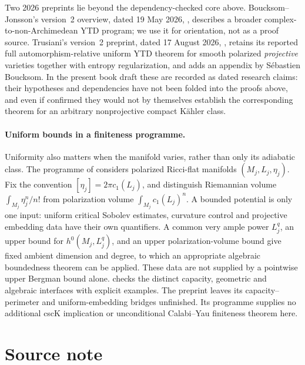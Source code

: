 Two 2026 preprints lie beyond the dependency-checked core above.
Boucksom--Jonsson's version~2 overview, dated 19 May 2026,
\cite{BJ26ComplexNA}, describes a broader complex-to-non-Archimedean YTD
program; we use it for orientation, not as a proof source.  Trusiani's
version~2 preprint, dated 17 August 2026, \cite{Trusiani26}, retains its
reported full
automorphism-relative uniform YTD theorem for smooth polarized
\emph{projective} varieties together with entropy regularization, and adds
an appendix by S\'{e}bastien Boucksom.  In the present book draft these are
recorded as dated research claims: their hypotheses and dependencies have
not been folded into the proofs above, and even if confirmed they would not
by themselves establish the corresponding theorem for an arbitrary
nonprojective compact K\"ahler class.

\paragraph{Uniform bounds in a finiteness programme.}
Uniformity also matters when the manifold varies, rather than only its
adiabatic class. The programme of
\cite[Sections~4--9]{Truong26PolarizedCYFinitenessV1} considers polarized
Ricci-flat manifolds \((M_j,L_j,\eta_j)\). Fix the convention
\([\eta_j]=2\pi c_1(L_j)\), and distinguish Riemannian volume
\(\int_{M_j}\eta_j^n/n!\) from polarization volume
\(\int_{M_j}c_1(L_j)^n\). A bounded potential is only one input:
uniform critical Sobolev estimates, curvature control and projective
embedding data have their own quantifiers. A common very ample power
\(L_j^q\), an upper bound for \(h^0(M_j,L_j^q)\), and an upper
polarization-volume bound give fixed ambient dimension and degree,
to which an appropriate algebraic boundedness theorem can be applied.
These data are not supplied by a pointwise upper Bergman bound alone.
 checks the distinct
capacity, geometric and algebraic interfaces with explicit examples.
The preprint leaves its capacity--perimeter and uniform-embedding
bridges unfinished. Its programme supplies no additional cscK
implication or unconditional Calabi--Yau finiteness theorem here.

\section*{Source note}
\label{sec:mpwn-k-source-note}

